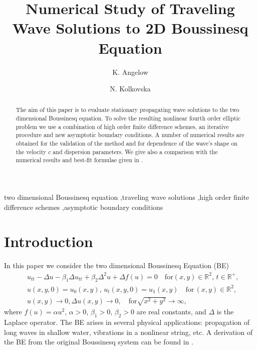 \documentclass[preprint]{elsarticle}
\newcommand{\RR}{\mathbb{R}}
\begin{document}
\begin{frontmatter}

\title{Numerical Study of Traveling Wave Solutions to 2D Boussinesq  Equation}


\author{K. Angelow}
\author{N. Kolkovska}

\address{Institute of Mathematics and Informatics, Bulgarian Academy of Sciences, Acad. G.~Bonchev Bl.8, 1113 Sofia, Bulgaria}

\begin{abstract}
The aim of this paper is to evaluate stationary  propagating  wave solutions  
 to the two dimensional Boussinesq  equation. To solve the resulting nonlinear fourth order elliptic  problem we use a  combination of high order finite difference schemes, an iterative procedure  and  new asymptotic boundary conditions.   A number of numerical results are obtained for the validation of the method and for dependence of the wave's shape on the velocity $c$ and dispersion parameters. We give also a comparison with  the numerical results and best-fit formulae given in \cite{Ch2011,Ch2012}.

\end{abstract}
\begin{keyword}
two dimensional Boussinesq  equation \sep traveling wave solutions  \sep high order finite difference schemes \sep asymptotic boundary conditions
 \end{keyword}
\end{frontmatter}


\section{Introduction}\label{introduction}

In this paper we  consider the two dimensional Boussinesq  Equation (BE)
\begin{align}
&u_{tt} - \Delta u -\beta_1  \Delta u_{tt} +\beta_2 \Delta ^2 u + \Delta f(u)=0   \quad \text{for}  (x,y) \in \RR^2, \, t\in\RR^+,\label{eq1}
\\ \nonumber &u(x,y,0)=u_0(x,y), \, u_t(x,y,0)=u_1(x,y)   \quad\text{for} \, (x,y) \in \RR^2,
\\  &u(x,y) \rightarrow 0,  \Delta u(x,y) \rightarrow 0 ,  \quad \text{for}  \sqrt{x^2 + y^2} \rightarrow \infty, \label{eq11}
\end{align}
where   $f(u)=\alpha u^2$,  $\alpha>0$, $\beta_1>0$, $\beta_2>0$  are real constants, and $\Delta$ is the Laplace operator. The BE arises in several physical applications:  propagation of long waves in shallow water, vibrations in a   nonlinear string,  etc. A derivation of the BE from the original Boussinesq system can be found in \cite{ChChr}.
\end{document}
